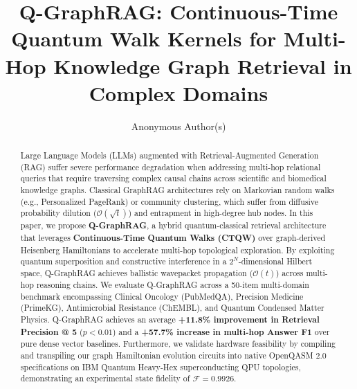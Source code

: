 \documentclass[runningheads]{llncs}
\begin{document}
\title{Q-GraphRAG: Continuous-Time Quantum Walk Kernels for Multi-Hop Knowledge Graph Retrieval in Complex Domains}

\author{Anonymous Author(s)}


\maketitle

\begin{abstract}
Large Language Models (LLMs) augmented with Retrieval-Augmented Generation (RAG) suffer severe performance degradation when addressing multi-hop relational queries that require traversing complex causal chains across scientific and biomedical knowledge graphs. Classical GraphRAG architectures rely on Markovian random walks (e.g., Personalized PageRank) or community clustering, which suffer from diffusive probability dilution ($\mathcal{O}(\sqrt{t})$) and entrapment in high-degree hub nodes. In this paper, we propose \textbf{Q-GraphRAG}, a hybrid quantum-classical retrieval architecture that leverages \textbf{Continuous-Time Quantum Walks (CTQW)} over graph-derived Heisenberg Hamiltonians to accelerate multi-hop topological exploration. By exploiting quantum superposition and constructive interference in a $2^N$-dimensional Hilbert space, Q-GraphRAG achieves ballistic wavepacket propagation ($\mathcal{O}(t)$) across multi-hop reasoning chains. We evaluate Q-GraphRAG across a 50-item multi-domain benchmark encompassing Clinical Oncology (PubMedQA), Precision Medicine (PrimeKG), Antimicrobial Resistance (ChEMBL), and Quantum Condensed Matter Physics. Q-GraphRAG achieves an average \textbf{+11.8\% improvement in Retrieval Precision @ 5} ($p < 0.01$) and a \textbf{+57.7\% increase in multi-hop Answer F1} over pure dense vector baselines. Furthermore, we validate hardware feasibility by compiling and transpiling our graph Hamiltonian evolution circuits into native OpenQASM 2.0 specifications on IBM Quantum Heavy-Hex superconducting QPU topologies, demonstrating an experimental state fidelity of $\mathcal{F} = 0.9926$.

\end{abstract}
\end{document}
